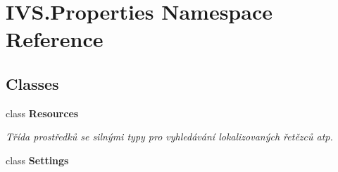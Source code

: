 \hypertarget{namespace_i_v_s_1_1_properties}{}\section{I\+V\+S.\+Properties Namespace Reference}
\label{namespace_i_v_s_1_1_properties}
\subsection*{Classes}
\begin{DoxyCompactItemize}
\item 
class {\bfseries Resources}
\begin{DoxyCompactList}\small\item\em Třída prostředků se silnými typy pro vyhledávání lokalizovaných řetězců atp. \end{DoxyCompactList}\item 
class {\bfseries Settings}
\end{DoxyCompactItemize}
